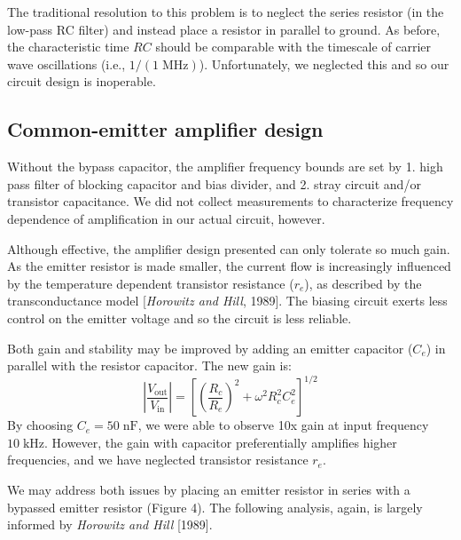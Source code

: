 \documentclass[11pt]{article}
\newcommand {\mt}{\mathrm}
\newcommand {\unit}[1]{\; \mt{#1}}
\begin{document}
The traditional resolution to this problem is to neglect the series resistor
(in the low-pass RC filter) and instead place a resistor in parallel to ground.
As before, the characteristic time $RC$ should be comparable with the timescale
of carrier wave oscillations (i.e., $1 / (1 \unit{MHz})$).  Unfortunately, we
neglected this and so our circuit design is inoperable.

\subsection{Common-emitter amplifier design}

Without the bypass capacitor, the amplifier frequency bounds are set by 1. high
pass filter of blocking capacitor and bias divider, and 2. stray circuit and/or
transistor capacitance.  We did not collect measurements to characterize
frequency dependence of amplification in our actual circuit, however.

Although effective, the amplifier design presented can only tolerate so much
gain.  As the emitter resistor is made smaller, the current flow is
increasingly influenced by the temperature dependent transistor resistance
($r_e$), as described by the transconductance model [\textit{Horowitz and
Hill}, 1989]. The biasing circuit exerts less control on the emitter voltage
and so the circuit is less reliable.

Both gain and stability may be improved by adding an emitter capacitor ($C_e$)
in parallel with the resistor capacitor.  The new gain is:
\[
  \left| \frac{V_\mt{out}}{V_\mt{in}} \right|
    = \left[ \left(\frac{R_c}{R_e}\right)^2
      + \omega^2 R_c^2 C_e^2 \right]^{1/2}
\]
By choosing $C_e = 50 \unit{nF}$, we were able to observe 10x gain at input
frequency $10 \unit{kHz}$.  However, the gain with capacitor preferentially
amplifies higher frequencies, and we have neglected transistor resistance
$r_e$.

We may address both issues by placing an emitter resistor in series with a
bypassed emitter resistor (Figure 4).  The following analysis, again, is
largely informed by \textit{Horowitz and Hill} [1989].
\end{document}
